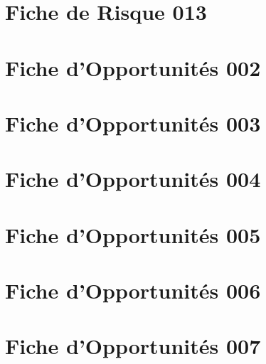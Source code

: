 \documentclass[asi]{picINSA}
\begin{document}
\chapter*{Fiche de Risque 013}



%
\chapter*{Fiche d'Opportunités 002}

\chapter*{Fiche d'Opportunités 003}

\chapter*{Fiche d'Opportunités 004}

\chapter*{Fiche d'Opportunités 005}

\chapter*{Fiche d'Opportunités 006}

\chapter*{Fiche d'Opportunités 007}

\end{document}
